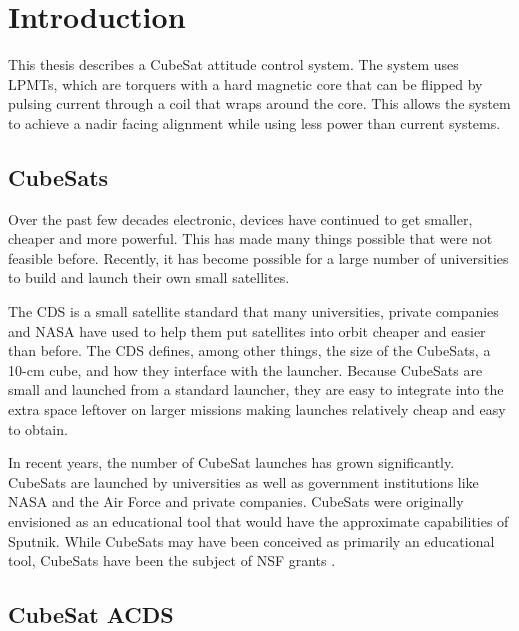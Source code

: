 

\chapter{Introduction}

This thesis describes a CubeSat attitude control system. The system uses \acfp{LPMT}, which are torquers with a hard magnetic core that can be flipped by pulsing current through a coil that wraps around the core. This allows the system to achieve a nadir facing alignment while using less power than current systems. 

\section{CubeSats}

Over the past few decades electronic, devices have continued to get smaller, cheaper and more powerful. This has made many things possible that were not feasible before. Recently, it has become possible for a large number of universities to build and launch their own small satellites.

The \acf{CDS} is a small satellite standard that many universities, private companies and NASA have used to help them put satellites into orbit cheaper and easier than before. The \ac{CDS} defines, among other things, the size of the CubeSats, a 10-cm cube, and how they interface with the launcher. Because CubeSats are small and launched from a standard launcher, they are easy to integrate into the extra space leftover on larger missions making launches relatively cheap and easy to obtain.

In recent years, the number of CubeSat launches has grown significantly. CubeSats are launched by universities as well as government institutions like NASA and the Air Force  and private companies. CubeSats were originally envisioned as an educational tool that would have the approximate capabilities of Sputnik. While CubeSats may have been conceived as primarily an educational tool,  CubeSats have been the subject of NSF grants \cite{RAXnsf}.

\section{CubeSat \acs{ACDS}}

